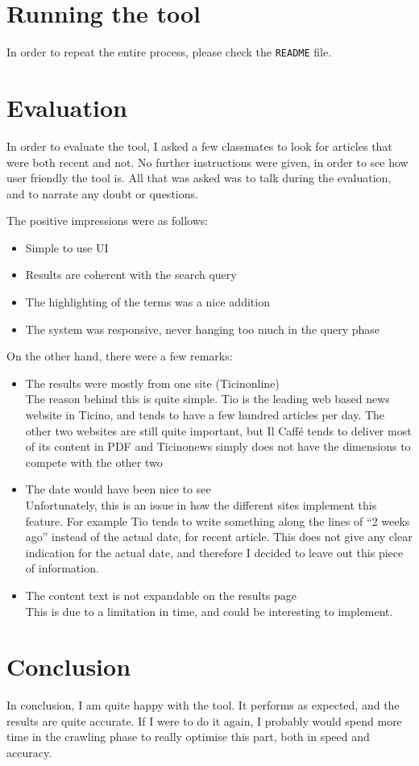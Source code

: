 \documentclass[a4paper]{article}
\begin{document}
\section{Running the tool}
In order to repeat the entire process, please check the \texttt{README} file.

\section{Evaluation}
In order to evaluate the tool, I asked a few classmates to look for articles that were both recent and not. No further instructions were given, in order to see how user friendly the tool is. All that was asked was to talk during the evaluation, and to narrate any doubt or questions. 

The positive impressions were as follows:
\begin{itemize}
\item Simple to use UI
\item Results are coherent with the search query
\item The highlighting of the terms was a nice addition
\item The system was responsive, never hanging too much in the query phase
\end{itemize}

\noindent On the other hand, there were a few remarks:
\begin{itemize}
\item The results were mostly from one site (Ticinonline)\\
The reason behind this is quite simple. Tio is the leading web based news website in Ticino, and tends to have a few hundred articles per day. The other two websites are still quite important, but Il Caff\'e tends to deliver most of its content in PDF and Ticinonews simply does not have the dimensions to compete with the other two
\item The date would have been nice to see\\
Unfortunately, this is an issue in how the different sites implement this feature. For example Tio tends to write something along the lines of ``2 weeks ago'' instead of the actual date, for recent article. This does not give any clear indication for the actual date, and therefore I decided to leave out this piece of information.
\item The content text is not expandable on the results page\\
This is due to a limitation in time, and could be interesting to implement.

\end{itemize}

\section{Conclusion}
In conclusion, I am quite happy with the tool. It performs as expected, and the results are quite accurate. If I were to do it again, I probably would spend more time in the crawling phase to really optimise this part, both in speed and accuracy. 
\end{document}
